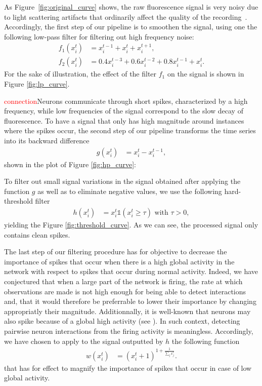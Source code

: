 \documentclass[wcp]{jmlr}
\begin{document}
As Figure~\ref{fig:original_curve} shows, the raw
fluorescence signal is very noisy due to light scattering artifacts that
ordinarily affect the quality of the recording~\citep{lichtman2011big}.
Accordingly, the first step of our pipeline is to smoothen the signal, using
one the following low-pass filter for filtering out high frequency noise:
\begin{align}
f_1(x^t_i) &= x^{t-1}_i + x^t_i + x^{t+1}_i \label{eq:symetric-median}, \\
f_2(x^t_i) &= 0.4 x^{t-3}_i + 0.6 x^{t-2}_i + 0.8 x^{t-1}_i + x_i^t.
\label{eq:weighted-asymetric-median}
\end{align}
For the sake of illustration, the effect of the filter $f_1$ on the signal
is shown in Figure \ref{fig:lp_curve}.


\textcolor{red}{connection}Neurons communicate through short spikes, characterized by a high
frequency, while low frequencies of the signal correspond to the slow
decay of fluorescence. To have a signal that only has high magnitude around instances where the spikes occur, the second step of our pipeline transforms the time series into its backward
difference
\begin{align}
g(x^{t}_{i}) &= x^{t}_i - x^{t-1}_i \label{eq:high-pass-filter},
\end{align}
shown in the plot of Figure \ref{fig:hp_curve}:

To filter out small signal variations in the signal obtained after applying the function $g$ as well as to eliminate negative values, we use the following hard-threshold filter
\begin{align}
h(x^{t}_i) &= x^{t}_i \mathbb{1}(x^{t}_i \geq \tau) \text{ with } \tau > 0,
\end{align}
yielding the Figure \ref{fig:threshold_curve}.
As we can see, the processed signal only contains clean spikes. 

The last step of our filtering procedure has for objective to decrease the importance of spikes that occur when there is a high global activity in the network with respect to  spikes that occur during normal activity. Indeed, we have conjectured that when a large part of the network is firing, the rate at which observations are made is not high enough for being able to detect interactions and, that it would therefore be preferrable to lower their importance by changing appropriatly their magnitude. Additionnally, it is well-known that neurons may also spike because of a global high activity (see \cite{stetter2012model}). In such  context, detecting pairwise neuron interactions from the firing activity is meaningless. 
Accordingly, we have chosen to apply to the signal outputted by $h$ the following function  
\begin{align}
 w(x^{t}_i) &= (x^{t}_i + 1 )^{1 + \frac{1}{\sum_{j} x^{t}_j}}.
\end{align}
that has for effect to magnify the importance of spikes that occur in case of low global activity.
\end{document}
